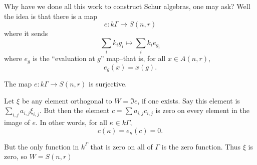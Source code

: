 \documentclass[12pt]{article}
\begin{document}
Why have we done all this work to construct Schur algebras, one may ask? Well the idea is that there is a map
\[e:k\Gamma\to S(n,r)\]
where it sends 
\[\sum_i k_i g_i\mapsto \sum_i k_i e_{g_i}\]
where $e_g$ is the ``evaluation at $g$'' map--that is, for all $x\in A(n,r)$,
\[e_g(x)=x(g).\]
\begin{lem}\label{lem:e-surj}
	The map $e:k\Gamma\to S(n,r)$ is surjective.
\end{lem}
\begin{prf}
	Let $\xi$ be any element orthogonal to $W=\Im e$, if one exists. Say this element is $\sum_{i,j}a_{i,j}\xi_{i,j}$.
	But then the element $c=\sum a_{i,j}c_{i,j}$ is zero on every element in the image of $e$. In other words, for all $\kappa\in k\Gamma$,
	\[c(\kappa)=e_\kappa(c)=0.\]
	
	But the only function in $k^\Gamma$ that is zero on all of $\Gamma$ is the zero function. Thus $\xi$ is zero, so $W=S(n,r)$
\end{prf}
\end{document}
